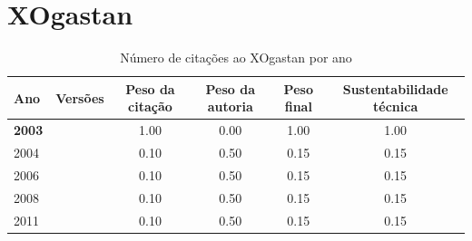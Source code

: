 \section{XOgastan}


\begin{table}[H]
\caption{Número de citações ao XOgastan por ano}
\centering
\begin{tabular}{| l | c | c | c | c | c |}
  \hline
  Ano & Versões & Peso da citação & Peso da autoria & Peso final & Sustentabilidade técnica \\
  \hline
            {\bf 2003}
          &
          
          &
          1.00
          &
          0.00
          &
          1.00
          &
            {\color{blue} 1.00}
          \\
\hline
            2004
          &
          
          &
          0.10
          &
          0.50
          &
          0.15
          &
            {\color{red} 0.15}
          \\
\hline
            2006
          &
          
          &
          0.10
          &
          0.50
          &
          0.15
          &
            {\color{red} 0.15}
          \\
\hline
            2008
          &
          
          &
          0.10
          &
          0.50
          &
          0.15
          &
            {\color{red} 0.15}
          \\
\hline
            2011
          &
          
          &
          0.10
          &
          0.50
          &
          0.15
          &
            {\color{red} 0.15}
          \\
\hline
\end{tabular}
\end{table}




